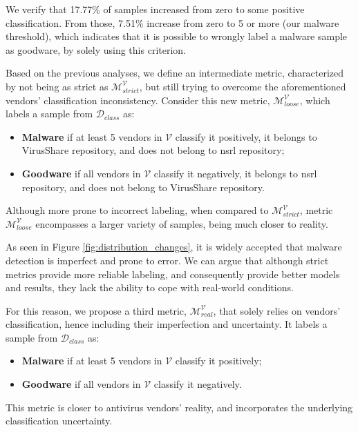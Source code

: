 We verify that 17.77\% of samples increased from zero to some positive classification. From those, 7.51\% increase from zero to 5 or more (our malware threshold), which indicates that it is possible to wrongly label a malware sample as goodware, by solely using this criterion.

Based on the previous analyses, we define an intermediate metric, characterized by not being as strict as $\mathcal{M}_{strict}^\mathcal{V}$, but still trying to overcome the aforementioned vendors' classification inconsistency. Consider this new metric, $\mathcal{M}_{loose}^\mathcal{V}$, which labels a sample from $\mathcal{D}_{class}$ as:

\begin{itemize}
	\item \textbf{Malware} if at least 5 vendors in $\mathcal{V}$ classify it positively, it belongs to VirusShare repository, and does not belong to \gls{nsrl} repository;
	\item \textbf{Goodware} if all vendors in $\mathcal{V}$ classify it negatively, it belongs to \gls{nsrl} repository, and does not belong to VirusShare repository.
\end{itemize}

Although more prone to incorrect labeling, when compared to $\mathcal{M}_{strict}^\mathcal{V}$, metric $\mathcal{M}_{loose}^\mathcal{V}$ encompasses a larger variety of samples, being much closer to reality.

As seen in Figure \ref{fig:distribution_changes}, it is widely accepted that malware detection is imperfect and prone to error. We can argue that although strict metrics provide more reliable labeling, and consequently provide better models and results, they lack the ability to cope with real-world conditions. 

For this reason, we propose a third metric, $\mathcal{M}_{real}^\mathcal{V}$, that solely relies on vendors' classification, hence including their imperfection and uncertainty. It labels a sample from $\mathcal{D}_{class}$ as:

\begin{itemize}
	\item \textbf{Malware} if at least 5 vendors in $\mathcal{V}$ classify it positively;
	\item \textbf{Goodware} if all vendors in $\mathcal{V}$ classify it negatively.
\end{itemize}

This metric is closer to antivirus vendors' reality, and incorporates the underlying classification uncertainty.


